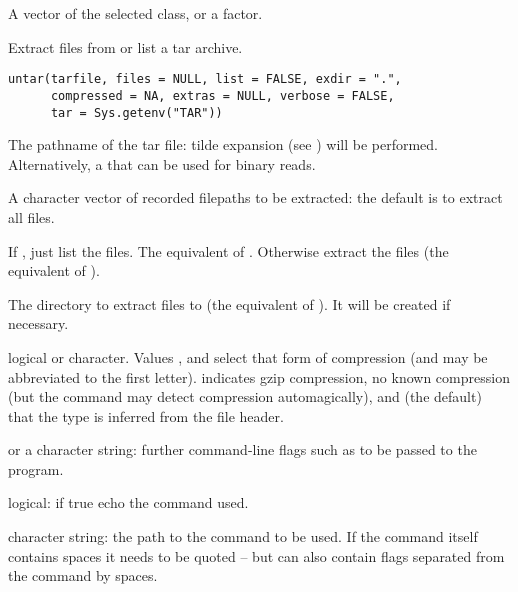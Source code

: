 %
\begin{Value}
A vector of the selected class, or a factor.
\end{Value}
%
\begin{SeeAlso}\relax
{}
\end{SeeAlso}
%
\begin{Description}\relax
Extract files from or list a tar archive.
\end{Description}
%
\begin{Usage}
\begin{verbatim}
untar(tarfile, files = NULL, list = FALSE, exdir = ".",
      compressed = NA, extras = NULL, verbose = FALSE,
      tar = Sys.getenv("TAR"))
\end{verbatim}
\end{Usage}
%
\begin{Arguments}
\begin{ldescription}
\item[\code{tarfile}] The pathname of the tar file: tilde expansion (see
) will be performed.  Alternatively, a
 that can be used for binary reads.

\item[\code{files}] A character vector of recorded filepaths to be extracted:
the default is to extract all files.

\item[\code{list}] If , just list the files.  The equivalent of
.  Otherwise extract the files (the equivalent of
).

\item[\code{exdir}] The directory to extract files to (the equivalent of
).  It will be created if necessary.

\item[\code{compressed}] logical or character.  Values ,
 and  select that form of compression (and
may be abbreviated to the first letter).   indicates gzip
compression,  no known compression (but the
 command may detect compression automagically), and
 (the default) that the type is inferred from the file
header.

\item[\code{extras}]  or a character string: further command-line
flags such as  to be passed to the  program.

\item[\code{verbose}] logical: if true echo the command used.

\item[\code{tar}] character string: the path to the command to be used.  If
the command itself contains spaces it needs to be quoted -- but
 can also contain flags separated from the command by spaces.
\end{ldescription}
\end{Arguments}
